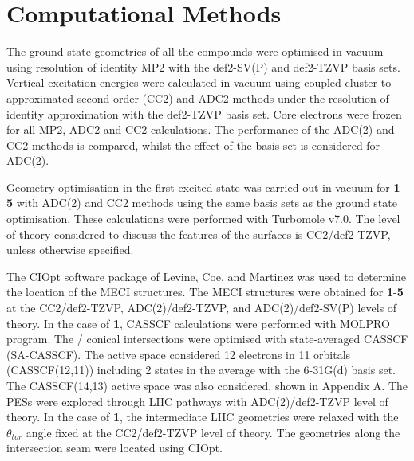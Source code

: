 \section{Computational Methods}\label{section: NRdecay_methods}
The ground state geometries of all the compounds were optimised in vacuum using resolution of identity \acf{MP2} with the def2-SV(P) and def2-TZVP basis sets.\cite{Haase1993,Schafer1992,Weigend2005} Vertical excitation energies were calculated in vacuum using coupled cluster to approximated second order (CC2) and \acf{ADC2} methods under the resolution of identity approximation with the def2-TZVP basis set.\cite{Christiansen1995,Hattig2000,Hattig2002,Kohn2003,Hattig2005} Core electrons were frozen for all \ac{MP2}, \ac{ADC2} and CC2 calculations. The performance of the ADC(2) and CC2 methods is compared, whilst the effect of the basis set is considered for ADC(2). 

Geometry optimisation in the first excited state was carried out in vacuum for \textbf{1}-\textbf{5} with ADC(2) and CC2 methods using the same basis sets as the ground state optimisation. These calculations were performed with Turbomole v7.0.\cite{Turbomole} The level of theory considered to discuss the features of the surfaces is CC2/def2-TZVP, unless otherwise specified.

The CIOpt software package of Levine, Coe, and Martinez was used to determine the location of the \acf{MECI} structures.\cite{Levine2008} The MECI structures were obtained for \textbf{1}-\textbf{5} at the CC2/def2-TZVP, ADC(2)/def2-TZVP, and ADC(2)/def2-SV(P) levels of theory. In the case of \textbf{1}, \ac{CASSCF} calculations were performed with MOLPRO program.\cite{Molpro} The \sone/\szero{} conical intersections were optimised with state-averaged CASSCF (SA-CASSCF). The active space considered 12 electrons in 11 orbitals (CASSCF(12,11)) including 2 states in the average with the 6-31G(d) basis set. The CASSCF(14,13) active space was also considered, shown in Appendix A. The \acp{PES} were explored through \ac{LIIC} pathways with ADC(2)/def2-TZVP level of theory. In the case of \textbf{1}, the intermediate \ac{LIIC} geometries were relaxed with the $\theta_{tor}$ angle fixed at the CC2/def2-TZVP level of theory. The geometries along the intersection seam were located using CIOpt. 

